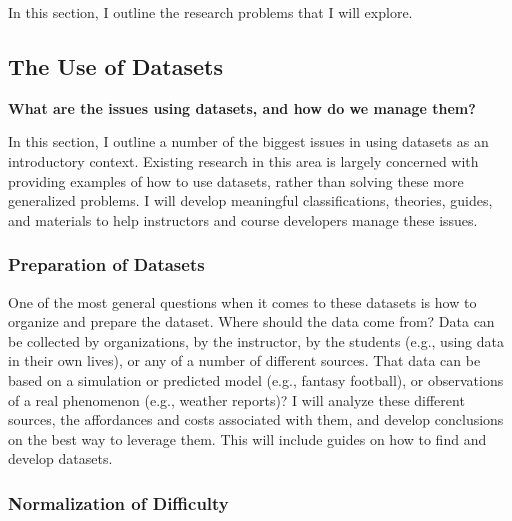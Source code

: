 In this section, I outline the research problems that I will explore.

\subsection{The Use of Datasets}

\textbf{What are the issues using datasets, and how do we manage them?}

In this section, I outline a number of the biggest issues in using datasets as an introductory context.
Existing research in this area is largely concerned with providing examples of how to use datasets, rather than solving these more generalized problems.
I will develop meaningful classifications, theories, guides, and materials to help instructors and course developers manage these issues.

\subsubsection{Preparation of Datasets}

One of the most general questions when it comes to these datasets is how to organize and prepare the dataset. Where should the data come from? Data can be collected by organizations, by the instructor, by the students (e.g., using data in their own lives), or any of a number of different sources. That data can be based on a simulation or predicted model (e.g., fantasy football), or observations of a real phenomenon (e.g., weather reports)? I will analyze these different sources, the affordances and costs associated with them, and develop conclusions on the best way to leverage them. This will include guides on how to find and develop datasets.

\subsubsection{Normalization of Difficulty}

